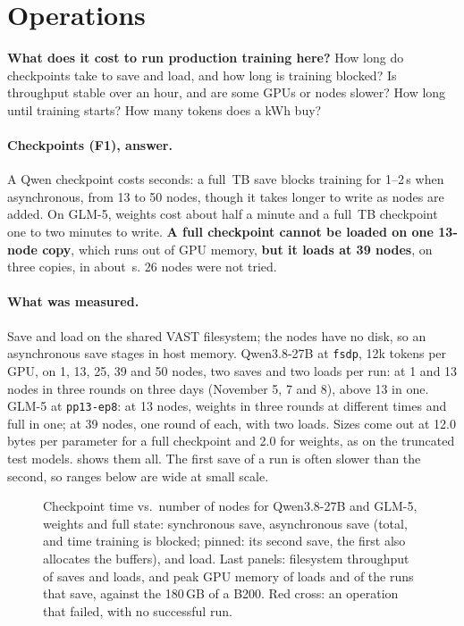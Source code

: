 \section{Operations}
\label{sec:operations}

\begin{question}
  \textbf{What does it cost to run production training here?} How long do checkpoints take to save and
  load, and how long is training blocked? Is throughput stable over an hour, and are some GPUs or nodes
  slower? How long until training starts? How many tokens does a kWh buy?
\end{question}

\paragraph{Checkpoints (F1), answer.} A Qwen checkpoint costs seconds: a full \TriCkQSizeFull\,TB save blocks training for 1--2\,s when asynchronous, from 13 to 50 nodes, though it takes longer to write as nodes are added. On GLM-5, weights cost about half a minute and a full \TriCkGFSize\,TB checkpoint one to two minutes to write. \textbf{A full checkpoint cannot be loaded on one 13-node copy}, which runs out of GPU memory, \textbf{but it loads at 39 nodes}, on three copies, in about \TriCkGBigFLoadHi\,s. 26 nodes were not tried.

\paragraph{What was measured.} Save and load on the shared VAST filesystem; the nodes have no disk, so an asynchronous save stages in host memory. Qwen3.8-27B at \texttt{fsdp}, 12k tokens per GPU, on 1, 13, 25, 39 and 50 nodes, two saves and two loads per run: at 1 and 13 nodes in three rounds on three days (November 5, 7 and 8), above 13 in one. GLM-5 at \texttt{pp13-ep8}: at 13 nodes, weights in three rounds at different times and full in one; at 39 nodes, one round of each, with two loads. Sizes come out at 12.0 bytes per parameter for a full checkpoint and 2.0 for weights, as on the truncated test models.  shows them all. The first save of a run is often slower than the second, so ranges below are wide at small scale.

\begin{figure}[h]
  \centering{}
  \caption{Checkpoint time vs.\ number of nodes for Qwen3.8-27B and GLM-5, weights and full state: synchronous save, asynchronous save (total, and time training is blocked; pinned: its second save, the first also allocates the buffers), and load. Last panels: filesystem throughput of saves and loads, and peak GPU memory of loads and of the runs that save, against the 180\,GB of a B200. Red cross: an operation that failed, with no successful run. \TriCkptOverMemoryNote{} }
  \label{fig:checkpoint}
\end{figure}

